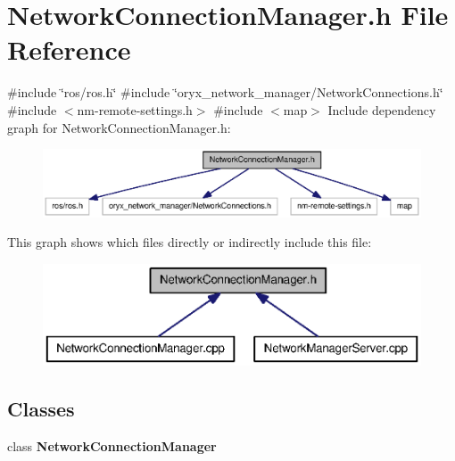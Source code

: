 \section{\-Network\-Connection\-Manager.\-h \-File \-Reference}
\label{NetworkConnectionManager_8h}
{\ttfamily \#include \char`\"{}ros/ros.\-h\char`\"{}}\*
{\ttfamily \#include \char`\"{}oryx\-\_\-network\-\_\-manager/\-Network\-Connections.\-h\char`\"{}}\*
{\ttfamily \#include $<$nm-\/remote-\/settings.\-h$>$}\*
{\ttfamily \#include $<$map$>$}\*
\-Include dependency graph for \-Network\-Connection\-Manager.\-h\-:
\nopagebreak
\begin{figure}[H]
\begin{center}
\leavevmode
\includegraphics[width=350pt]{NetworkConnectionManager_8h__incl}
\end{center}
\end{figure}
\-This graph shows which files directly or indirectly include this file\-:
\nopagebreak
\begin{figure}[H]
\begin{center}
\leavevmode
\includegraphics[width=350pt]{NetworkConnectionManager_8h__dep__incl}
\end{center}
\end{figure}
\subsection*{\-Classes}
\begin{DoxyCompactItemize}
\item 
class {\bf \-Network\-Connection\-Manager}
\end{DoxyCompactItemize}
